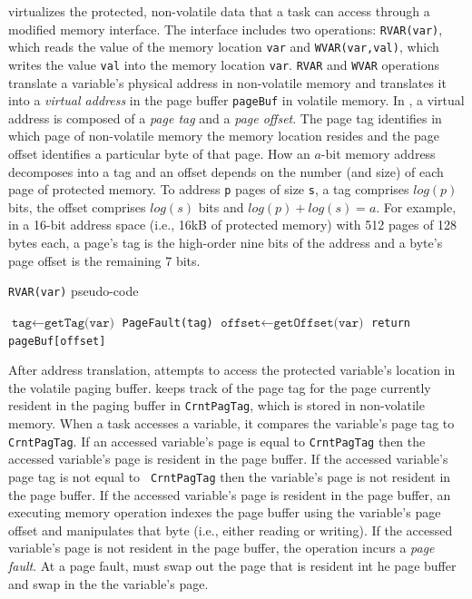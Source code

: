\sys virtualizes the protected, non-volatile data that a task can access
through a modified memory interface.  The interface includes two operations:
\texttt{RVAR(var)}, which reads the value of the memory location {\tt var} and
\texttt{WVAR(var,val)}, which writes the value {\tt val} into the memory
location {\tt var}.  
%
{\tt RVAR} and {\tt WVAR} operations translate a variable's physical address in
non-volatile memory and translates it into a \emph{virtual address} in the page
buffer \texttt{pageBuf} in volatile memory.  In \sys, a virtual address is
composed of a \emph{page tag} and a \emph{page offset}.  The page tag
identifies in which page of non-volatile memory the memory location resides and
the page offset identifies a particular byte of that page.  
%
How an $a$-bit memory address decomposes into a tag and an offset depends on
the number (and size) of each page of protected memory.  To address {\tt p}
pages of size {\tt s}, a tag comprises $log(p)$ bits, the offset comprises
$log(s)$ bits and $log(p) + log(s) = a$.   For example, in a 16-bit address
space (i.e., 16kB of protected memory) with 512 pages of 128 bytes each, a
page's tag is the high-order nine bits of the address and a byte's page offset
is the remaining 7 bits. 

\begin{algorithm}[t]
	\caption{\texttt{RVAR(var)} pseudo-code}
	\label{algo:rwar}
	\scriptsize
	\begin{algorithmic}[1]
		\State $\texttt{tag}\leftarrow \texttt{getTag(var)}$ 
			
		\State	\texttt{PageFault(tag)} 
		\EndIf
				\State $\texttt{offset}\leftarrow \texttt{getOffset(var)}$ 		
		\State \texttt{return pageBuf[offset]}  
	\end{algorithmic}
\end{algorithm}

After address translation, \sys attempts to access the protected variable's
location in the volatile paging buffer.  \sys keeps track of the page tag for
the page currently resident in the paging buffer in {\tt CrntPagTag}, which is
stored in non-volatile memory. When a task accesses a variable, it compares the
variable's page tag to {\tt CrntPagTag}.  If an accessed variable's page is
equal to {\tt CrntPagTag} then the accessed variable's page is resident in the
page buffer.  If the accessed variable's page tag is not equal to {\tt
CrntPagTag} then the variable's page is not resident in the page buffer.
%
If the accessed variable's page is resident in the page buffer, an executing
memory operation indexes the page buffer using the variable's page offset and
manipulates that byte (i.e., either reading or writing).
%
If the accessed variable's page is not resident in the page buffer, the
operation incurs a {\em page fault}. At a page fault, \sys must swap out the
page that is resident int he page buffer and swap in the the variable's page.

